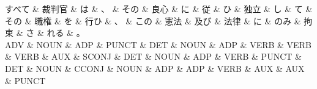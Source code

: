 \documentclass[tikz,border=5pt]{standalone}
\begin{document}
\normalsize
\begin{dependency}[edge unit distance=12.0pt]
    \begin{deptext}[column sep=1em]
        すべて \& 裁判官 \& は \& 、 \& その \& 良心 \& に \& 従 \& ひ \& 独立 \& し \& て \& その \& 職権 \& を \& 行ひ \& 、 \& この \& 憲法 \& 及び \& 法律 \& に \& のみ \& 拘束 \& さ \& れる \& 。\\
        ADV \& NOUN \& ADP \& PUNCT \& DET \& NOUN \& ADP \& VERB \& VERB \& VERB \& AUX \& SCONJ \& DET \& NOUN \& ADP \& VERB \& PUNCT \& DET \& NOUN \& CCONJ \& NOUN \& ADP \& ADP \& VERB \& AUX \& AUX \& PUNCT\\
    \end{deptext}
\end{dependency}
\end{document}
